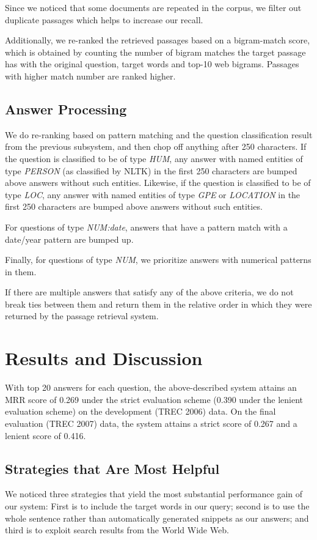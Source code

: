 \documentclass[11pt]{article}
\begin{document}
Since we noticed that some documents are repeated in the corpus, we filter out duplicate passages which helps to increase our recall.

Additionally, we re-ranked the retrieved passages based on a bigram-match score, which is obtained by counting the number of bigram matches the target passage has with the original question, target words and  top-10 web bigrams. Passages with higher match number are ranked higher.

\subsection{Answer Processing}
We do re-ranking based on pattern matching and the question classification result from the previous subsystem, and then chop off anything after 250 characters. If the question is classified to be of type \emph{HUM}, any answer with named entities of type \emph{PERSON} (as classified by NLTK) in the first 250 characters are bumped above answers without such entities. Likewise, if the question is classified to be of type \emph{LOC}, any answer with named entities of type \emph{GPE} or \emph{LOCATION} in the first 250 characters are bumped above answers without such entities. 

For questions of type \emph{NUM:date}, answers that have a pattern match with a date/year pattern are bumped up. 

Finally, for questions of type \emph{NUM}, we prioritize answers with numerical patterns in them. 

If there are multiple answers that satisfy any of the above criteria, we do not break ties between them and return them in the relative order in which they were returned by the passage retrieval system.

\section{Results and Discussion}
\label{sec:discussion}

With top 20 answers for each question, the above-described system attains an MRR score of 0.269 under the strict evaluation scheme (0.390 under the lenient evaluation scheme) on the development (TREC 2006) data. On the final evaluation (TREC 2007) data, the system attains a strict score of 0.267 and a lenient score of 0.416.

\subsection{Strategies that Are Most Helpful}
We noticed three strategies that yield the most substantial performance gain of our system: First is to include the target words in our query; second is to use the whole sentence rather than automatically generated snippets as our answers; and third is to exploit search results from the World Wide Web.
\end{document}
